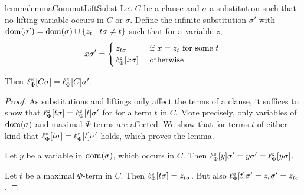 \begin{restatable}{lemma}{lemmaCommutLiftSubst}
	\label{lemma:lif}
	Let $C$ be a clause and $\sigma$ a substitution such that no lifting variable occurs in $C$ or $\sigma$.
	Define the infinite substitution $\sigma'$ with $\operatorname{dom}(\sigma') = \operatorname{dom}(\sigma) \cup \{ z_t \mid t\sigma \neq t \}$ such that for a variable $z$, 
	\[
		x \sigma' =
		\begin{cases} 
			z_{t\sigma} & \text{ if } x = z_t \text{ for some $t$ }\\%
			\lifphi{x\sigma} & \text{ otherwise}
		\end{cases} 
	\]

	Then
	$\ell_{\Phi}^{z}[C\sigma] =
	\ell_{\Phi}^{z}[C]\sigma'$.
\end{restatable}
\begin{proof}
	As substitutions and liftings only affect the terms of a clause, it suffices to  show that 
	$\ell_{\Phi}^{z}[t\sigma] = \ell_{\Phi}^{z}[t]\sigma'$ for for a term $t$ in $C$.
	More precisely, only variables of $\operatorname{dom}(\sigma)$ and maximal $\Phi$-terms are affected. 
	We show that for terms $t$ of either kind that
	$ \ell_{\Phi}^{z}[ t \sigma ] = \ell_{\Phi}^{z}[ t ] \sigma'$ holds, which proves the lemma.

	Let $y$ be a variable in $\operatorname{dom}(\sigma)$, which occurs in $C$. Then $\ell_{\Phi}^{z}[y]\sigma' = y\sigma' = \ell_{\Phi}^{z}[y\sigma]$.

	Let $t$ be a maximal $\Phi$-term in $C$.
	Then $\ell_{\Phi}^{z}[ t\sigma] = z_{t\sigma}$.
	But also $\ell_{\Phi}^{z}[t]\sigma' = z_t\sigma' = z_{t\sigma}$.
\end{proof}





